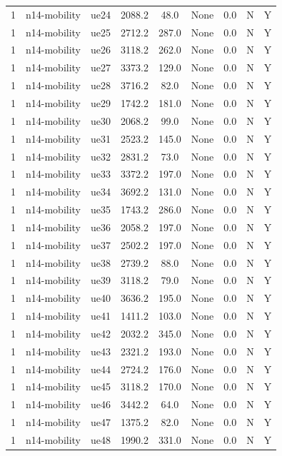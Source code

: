\begin{table}[ht]
\begin{tabular}{|c|c|c|c|c|c|c|c|c|}
1 & n14-mobility & ue24 & 2088.2 & 48.0 & None & 0.0 & N & Y \\
1 & n14-mobility & ue25 & 2712.2 & 287.0 & None & 0.0 & N & Y \\
1 & n14-mobility & ue26 & 3118.2 & 262.0 & None & 0.0 & N & Y \\
1 & n14-mobility & ue27 & 3373.2 & 129.0 & None & 0.0 & N & Y \\
1 & n14-mobility & ue28 & 3716.2 & 82.0 & None & 0.0 & N & Y \\
1 & n14-mobility & ue29 & 1742.2 & 181.0 & None & 0.0 & N & Y \\
1 & n14-mobility & ue30 & 2068.2 & 99.0 & None & 0.0 & N & Y \\
1 & n14-mobility & ue31 & 2523.2 & 145.0 & None & 0.0 & N & Y \\
1 & n14-mobility & ue32 & 2831.2 & 73.0 & None & 0.0 & N & Y \\
1 & n14-mobility & ue33 & 3372.2 & 197.0 & None & 0.0 & N & Y \\
1 & n14-mobility & ue34 & 3692.2 & 131.0 & None & 0.0 & N & Y \\
1 & n14-mobility & ue35 & 1743.2 & 286.0 & None & 0.0 & N & Y \\
1 & n14-mobility & ue36 & 2058.2 & 197.0 & None & 0.0 & N & Y \\
1 & n14-mobility & ue37 & 2502.2 & 197.0 & None & 0.0 & N & Y \\
1 & n14-mobility & ue38 & 2739.2 & 88.0 & None & 0.0 & N & Y \\
1 & n14-mobility & ue39 & 3118.2 & 79.0 & None & 0.0 & N & Y \\
1 & n14-mobility & ue40 & 3636.2 & 195.0 & None & 0.0 & N & Y \\
1 & n14-mobility & ue41 & 1411.2 & 103.0 & None & 0.0 & N & Y \\
1 & n14-mobility & ue42 & 2032.2 & 345.0 & None & 0.0 & N & Y \\
1 & n14-mobility & ue43 & 2321.2 & 193.0 & None & 0.0 & N & Y \\
1 & n14-mobility & ue44 & 2724.2 & 176.0 & None & 0.0 & N & Y \\
1 & n14-mobility & ue45 & 3118.2 & 170.0 & None & 0.0 & N & Y \\
1 & n14-mobility & ue46 & 3442.2 & 64.0 & None & 0.0 & N & Y \\
1 & n14-mobility & ue47 & 1375.2 & 82.0 & None & 0.0 & N & Y \\
1 & n14-mobility & ue48 & 1990.2 & 331.0 & None & 0.0 & N & Y \\

\end{tabular}
\end{table}
